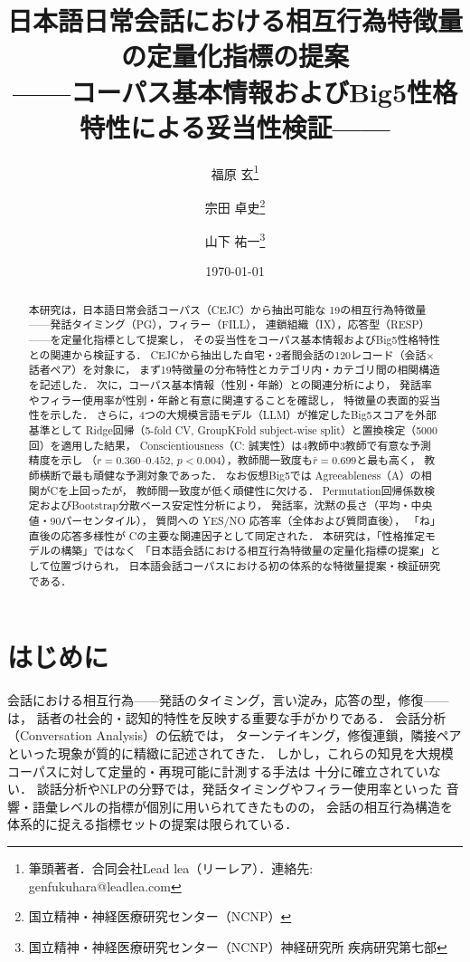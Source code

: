 \documentclass[dvipdfmx,11pt,a4paper]{bxjsarticle}
\title{日本語日常会話における相互行為特徴量の定量化指標の提案\\
——コーパス基本情報およびBig5性格特性による妥当性検証——}
\author{福原 玄\thanks{筆頭著者．合同会社Lead lea（リーレア）．連絡先: genfukuhara@leadlea.com}
\and 宗田 卓史\thanks{国立精神・神経医療研究センター（NCNP）}
\and 山下 祐一\thanks{国立精神・神経医療研究センター（NCNP）神経研究所 疾病研究第七部}}
\date{\today}
\renewcommand{\_}{\paperorigunderscore\allowbreak}%
\begin{document}
\maketitle

\begin{abstract}
本研究は，日本語日常会話コーパス（CEJC）から抽出可能な
19の相互行為特徴量——発話タイミング（PG），フィラー（FILL），
連鎖組織（IX），応答型（RESP）——を定量化指標として提案し，
その妥当性をコーパス基本情報およびBig5性格特性との関連から検証する．
CEJCから抽出した自宅・2者間会話の120レコード（会話$\times$話者ペア）を対象に，
まず19特徴量の分布特性とカテゴリ内・カテゴリ間の相関構造を記述した．
次に，コーパス基本情報（性別・年齢）との関連分析により，
発話率やフィラー使用率が性別・年齢と有意に関連することを確認し，
特徴量の表面的妥当性を示した．
さらに，4つの大規模言語モデル（LLM）が推定したBig5スコアを外部基準として
Ridge回帰（5-fold CV, GroupKFold subject-wise split）と置換検定（5000回）を適用した結果，
Conscientiousness（C: 誠実性）は4教師中3教師で有意な予測精度を示し
（$r = 0.360$--$0.452$, $p < 0.004$），教師間一致度も$\bar{r} = 0.699$と最も高く，
教師横断で最も頑健な予測対象であった．
なお仮想Big5では Agreeableness（A）の相関がCを上回ったが，
教師間一致度が低く頑健性に欠ける．
Permutation回帰係数検定およびBootstrap分散ベース安定性分析により，
発話率，沈黙の長さ（平均・中央値・90パーセンタイル），
質問への YES/NO 応答率（全体および質問直後），
「ね」直後の応答多様性が
Cの主要な関連因子として同定された．
本研究は，「性格推定モデルの構築」ではなく
「日本語会話における相互行為特徴量の定量化指標の提案」として位置づけられ，
日本語会話コーパスにおける初の体系的な特徴量提案・検証研究である．
\end{abstract}

\section{はじめに}

会話における相互行為——発話のタイミング，言い淀み，応答の型，修復——は，
話者の社会的・認知的特性を反映する重要な手がかりである．
会話分析（Conversation Analysis）の伝統では，
ターンテイキング\cite{sacks1974}，修復連鎖\cite{schegloff1977}，隣接ペアといった現象が質的に精緻に記述されてきた．
しかし，これらの知見を大規模コーパスに対して定量的・再現可能に計測する手法は
十分に確立されていない．
談話分析やNLPの分野では，発話タイミングやフィラー使用率といった
音響・語彙レベルの指標が個別に用いられてきたものの，
会話の相互行為構造を体系的に捉える指標セットの提案は限られている．
\end{document}
